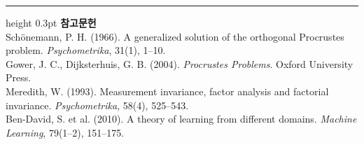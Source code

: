 \documentclass[10pt]{article}
\begin{document}
\vspace{0.6em}
\hrule height 0.3pt
\vspace{0.5em}
{\footnotesize
\textbf{참고문헌}\\[0.3em]
Schönemann, P. H. (1966). A generalized solution of the orthogonal Procrustes
problem. \emph{Psychometrika}, 31(1), 1--10.\\[0.15em]
Gower, J. C., Dijksterhuis, G. B. (2004). \emph{Procrustes Problems}. Oxford
University Press.\\[0.15em]
Meredith, W. (1993). Measurement invariance, factor analysis and factorial
invariance. \emph{Psychometrika}, 58(4), 525--543.\\[0.15em]
Ben-David, S. et al. (2010). A theory of learning from different domains.
\emph{Machine Learning}, 79(1--2), 151--175.
}
\end{document}
